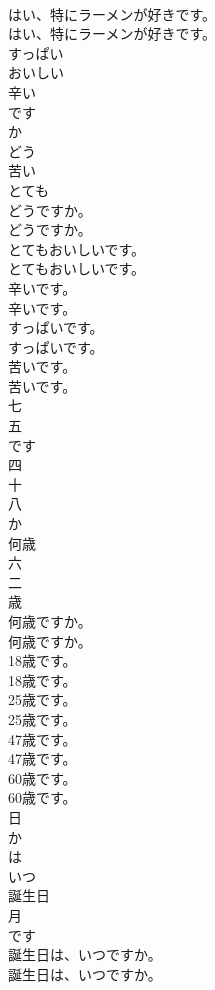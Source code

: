 \documentclass[8pt]{extreport}
\begin{document}
\begin{CJK}{UTF8}{min}
\\	はい、特にラーメンが好きです。	
\\	はい、特にラーメンが好きです。 
\\	すっぱい
\\	おいしい
\\	辛い
\\	です
\\	か
\\	どう
\\	苦い
\\	とても
\\	どうですか。	
\\	どうですか。 
\\	とてもおいしいです。	
\\	とてもおいしいです。 
\\	辛いです。	
\\	辛いです。 
\\	すっぱいです。	
\\	すっぱいです。 
\\	苦いです。	
\\	苦いです。 
\\	七
\\	五
\\	です
\\	四
\\	十
\\	八
\\	か
\\	何歳
\\	六
\\	二
\\	歳
\\	何歳ですか。	
\\	何歳ですか。 
\\	18歳です。	
\\	18歳です。 
\\	25歳です。	
\\	25歳です。 
\\	47歳です。	
\\	47歳です。 
\\	60歳です。	
\\	60歳です。 
\\	日
\\	か
\\	は
\\	いつ
\\	誕生日
\\	月
\\	です
\\	誕生日は、いつですか。	
\\	誕生日は、いつですか。 

\end{CJK}
\end{document}
